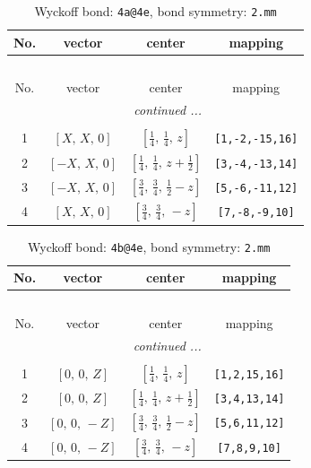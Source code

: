 \documentclass[fleqn,8pt]{jsarticle}
\begin{document}
\begin{longtable}{cccc}
\caption{Wyckoff bond: {\tt 4a@4e}, bond symmetry: {\tt 2.mm}}
 \\
 \hline \hline
No. & vector & center & mapping \\ \hline \endfirsthead

\multicolumn{3}{l}{\tablename\ \thetable{}} \\
 \hline \hline
No. & vector & center & mapping \\ \hline \endhead

 \hline \hline
\multicolumn{3}{r}{\footnotesize\it continued ...} \\ \endfoot

 \hline \hline
\multicolumn{3}{r}{} \\ \endlastfoot

1 & $\left[ X,\, X,\, 0 \right]$ & $\left[ \frac{1}{4},\, \frac{1}{4},\, z \right]$ & {\tt [1,-2,-15,16]} \\ \hline
2 & $\left[ - X,\, X,\, 0 \right]$ & $\left[ \frac{1}{4},\, \frac{1}{4},\, z + \frac{1}{2} \right]$ & {\tt [3,-4,-13,14]} \\ \hline
3 & $\left[ - X,\, X,\, 0 \right]$ & $\left[ \frac{3}{4},\, \frac{3}{4},\, \frac{1}{2} - z \right]$ & {\tt [5,-6,-11,12]} \\ \hline
4 & $\left[ X,\, X,\, 0 \right]$ & $\left[ \frac{3}{4},\, \frac{3}{4},\, - z \right]$ & {\tt [7,-8,-9,10]} \\
\end{longtable}
\renewcommand{\arraystretch}{1.2}
\begin{longtable}{cccc}
\caption{Wyckoff bond: {\tt 4b@4e}, bond symmetry: {\tt 2.mm}}
 \\
 \hline \hline
No. & vector & center & mapping \\ \hline \endfirsthead

\multicolumn{3}{l}{\tablename\ \thetable{}} \\
 \hline \hline
No. & vector & center & mapping \\ \hline \endhead

 \hline \hline
\multicolumn{3}{r}{\footnotesize\it continued ...} \\ \endfoot

 \hline \hline
\multicolumn{3}{r}{} \\ \endlastfoot

1 & $\left[ 0,\, 0,\, Z \right]$ & $\left[ \frac{1}{4},\, \frac{1}{4},\, z \right]$ & {\tt [1,2,15,16]} \\ \hline
2 & $\left[ 0,\, 0,\, Z \right]$ & $\left[ \frac{1}{4},\, \frac{1}{4},\, z + \frac{1}{2} \right]$ & {\tt [3,4,13,14]} \\ \hline
3 & $\left[ 0,\, 0,\, - Z \right]$ & $\left[ \frac{3}{4},\, \frac{3}{4},\, \frac{1}{2} - z \right]$ & {\tt [5,6,11,12]} \\ \hline
4 & $\left[ 0,\, 0,\, - Z \right]$ & $\left[ \frac{3}{4},\, \frac{3}{4},\, - z \right]$ & {\tt [7,8,9,10]} \\
\end{longtable}
\end{document}
